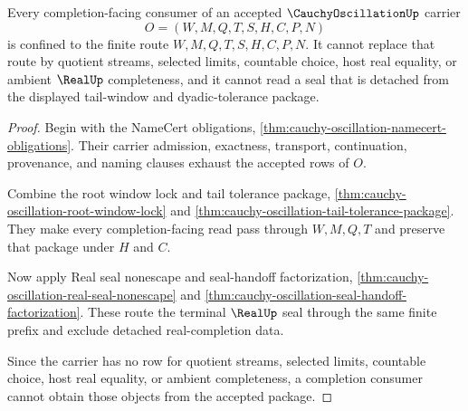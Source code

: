 \begin{theorem}
\label{thm:cauchy-oscillation-completion-consumer-refusal}
Every completion-facing consumer of an accepted $\CauchyOscillationUp$ carrier
$$
O=(W,M,Q,T,S,H,C,P,N)
$$
is confined to the finite route $W,M,Q,T,S,H,C,P,N$. It cannot replace that route by quotient streams, selected limits, countable choice, host real equality, or ambient $\RealUp$ completeness, and it cannot read a seal that is detached from the displayed tail-window and dyadic-tolerance package.
\end{theorem}
\begin{proof}
Begin with the NameCert obligations, \autoref{thm:cauchy-oscillation-namecert-obligations}. Their carrier admission, exactness, transport, continuation, provenance, and naming clauses exhaust the accepted rows of $O$.

Combine the root window lock and tail tolerance package, \autoref{thm:cauchy-oscillation-root-window-lock} and \autoref{thm:cauchy-oscillation-tail-tolerance-package}. They make every completion-facing read pass through $W,M,Q,T$ and preserve that package under $H$ and $C$.

Now apply Real seal nonescape and seal-handoff factorization, \autoref{thm:cauchy-oscillation-real-seal-nonescape} and \autoref{thm:cauchy-oscillation-seal-handoff-factorization}. These route the terminal $\RealUp$ seal through the same finite prefix and exclude detached real-completion data.

Since the carrier has no row for quotient streams, selected limits, countable choice, host real equality, or ambient completeness, a completion consumer cannot obtain those objects from the accepted package.
\end{proof}

